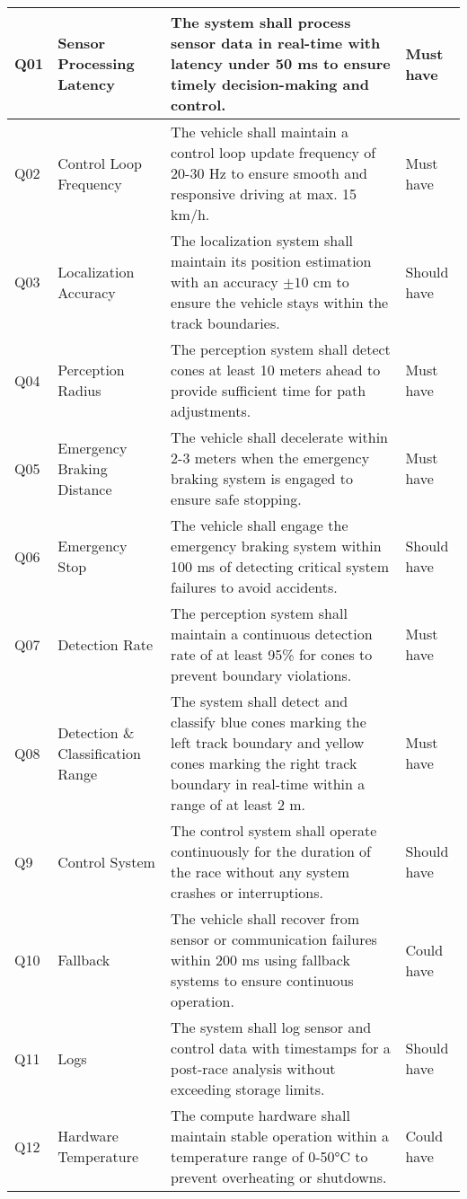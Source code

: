\begin{center}
\begin{longtable}{ | m{2em} | m{10em} | m{16em} | m{8em} | }
		Q01 & Sensor Processing Latency & The system shall process sensor data in real-time with latency under 50 ms to ensure timely decision-making and control. & Must have \\
		\hline
		Q02 & Control Loop Frequency & The vehicle shall maintain a control loop update frequency of 20-30 Hz to ensure smooth and responsive driving at max. 15 km/h. & Must have \\
		\hline
		Q03 & Localization Accuracy & The localization system shall maintain its position estimation with an accuracy \(\pm 10\) cm to ensure the vehicle stays within the track boundaries. & Should have \\
		\hline
		Q04 & Perception Radius & The perception system shall detect cones at least 10 meters ahead to provide sufficient time for path adjustments. & Must have \\
		\hline
		Q05 & Emergency Braking Distance & The vehicle shall decelerate within 2-3 meters when the emergency braking system is engaged to ensure safe stopping. & Must have \\
		\hline
		Q06 & Emergency Stop & The vehicle shall engage the emergency braking system within 100 ms of detecting critical system failures to avoid accidents. & Should have \\
		\hline
		Q07 & Detection Rate & The perception system shall maintain a continuous detection rate of at least 95\% for cones to prevent boundary violations. & Must have \\
		\hline
		Q08 & Detection \& Classification Range & The system shall detect and classify blue cones marking the left track boundary and yellow cones marking the right track boundary in real-time within a range of at least 2 m. & Must have \\
		\hline
		Q9 & Control System & The control system shall operate continuously for the duration of the race without any system crashes or interruptions. & Should have \\
		\hline
		Q10 & Fallback & The vehicle shall recover from sensor or communication failures within 200 ms using fallback systems to ensure continuous operation. & Could have \\
		\hline
		Q11 & Logs & The system shall log sensor and control data with timestamps for a post-race analysis without exceeding storage limits. & Should have \\
		\hline
		Q12 & Hardware Temperature & The compute hardware shall maintain stable operation within a temperature range of 0-50°C to prevent overheating or shutdowns. & Could have \\

\end{longtable}
\end{center}
